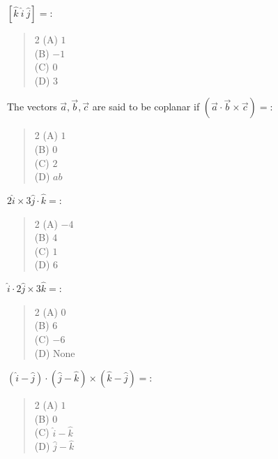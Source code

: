 \documentclass[11pt,a4paper]{article}
\begin{document}
\begin{mcqlist}
\item $[\hat{k}\ \hat{i}\ \hat{j}]=$:
\begin{quote}\begin{multicols}{2}
\noindent (A) $1$ \\
(B) $-1$ \\
(C) $0$ \\
(D) $3$
\end{multicols}\end{quote}

\item The vectors $\vec{a},\vec{b},\vec{c}$ are said to be coplanar if $(\vec{a}\cdot\vec{b}\times\vec{c})=$:
\begin{quote}\begin{multicols}{2}
\noindent (A) $1$ \\
(B) $0$ \\
(C) $2$ \\
(D) $ab$
\end{multicols}\end{quote}

\item $2\hat{i}\times 3\hat{j}\cdot\hat{k}=$:
\begin{quote}\begin{multicols}{2}
\noindent (A) $-4$ \\
(B) $4$ \\
(C) $1$ \\
(D) $6$
\end{multicols}\end{quote}

\item $\hat{i}\cdot 2\hat{j}\times 3\hat{k}=$:
\begin{quote}\begin{multicols}{2}
\noindent (A) $0$ \\
(B) $6$ \\
(C) $-6$ \\
(D) None
\end{multicols}\end{quote}

\item $(\hat{i}-\hat{j})\cdot(\hat{j}-\hat{k})\times(\hat{k}-\hat{j})=$:
\begin{quote}\begin{multicols}{2}
\noindent (A) $1$ \\
(B) $0$ \\
(C) $\hat{i}-\hat{k}$ \\
(D) $\hat{j}-\hat{k}$
\end{multicols}\end{quote}


\end{mcqlist}
\end{document}

